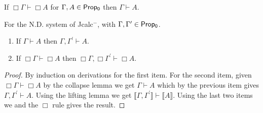 					\begin{theorem} If $\Box\Gamma\vdash \Box A$ for $\Gamma,A \in {\sf Prop_0}$ then $ \Gamma\vdash  A$.
					\end{theorem}
					\begin{theorem}[Weakening]
						For the N.D. system of {\sf Jcalc$^{-}$}, with $\Gamma, \Gamma^{\prime}\in {\sf Prop_0}$.
						\begin{enumerate}
							\item If  $\Gamma\vdash A$ then $\Gamma,\Gamma^{\prime}\vdash   A$.
							\item If  $\Box\Gamma\vdash \Box   A$ then $\Box\Gamma,\Box\Gamma^{\prime} \vdash \Box A$.
						\end{enumerate}
					\end{theorem} 
					\begin{proof}
						By induction on derivations for the first item. For the second item, given $\Box\Gamma\vdash \Box   A$ by the collapse lemma we get   $\Gamma\vdash   A$ which by the previous item
						gives $\Gamma,\Gamma^{\prime}\vdash   A$.  Using the lifting lemma we get $\llbracket \Gamma,\Gamma^{\prime}\rrbracket \vdash \llbracket  A \rrbracket$.
						Using the last two items we and the $\Box$ rule gives the result.
					\end{proof}
					
